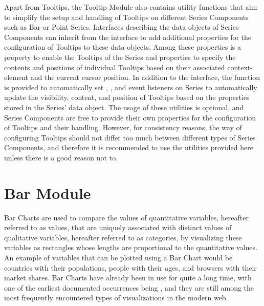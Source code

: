 Apart from Tooltips, the Tooltip Module also contains utility functions that aim to simplify the setup and handling of Tooltips on different Series Components such as Bar or Point Series.
Interfaces describing the data objects of Series Components can inherit from the  interface to add additional properties for the configuration of Tooltips to these data objects. 
Among these properties is a property to enable the Tooltips of the Series and properties to specify the contents and positions of individual Tooltips based on their associated context-element and the current cursor position.
In addition to the  interface, the  function is provided to automatically set , , and  event listeners on Series to automatically update the visibility, content, and position of Tooltips based on the  properties stored in the Series' data object.
The usage of these utilities is optional, and Series Components are free to provide their own properties for the configuration of Tooltips and their handling.
However, for consistency reasons, the way of configuring Tooltips should not differ too much between different types of Series Components, and therefore it is recommended to use the utilities provided here unless there is a good reason not to.


\section{Bar Module}

Bar Charts are used to compare the values of quantitative variables, hereafter referred to as values, that are uniquely associated with distinct values of qualitative variables, hereafter referred to as categories, by visualizing these variables as rectangles whose lengths are proportional to the quantitative values.
An example of variables that can be plotted using a Bar Chart would be countries with their populations, people with their ages, and browsers with their market shares.
Bar Charts have already been in use for quite a long time, with one of the earliest documented occurrences being \textcite{CommercialAndPoliticalAtlas}, and they are still among the most frequently encountered types of visualizations in the modern web.

